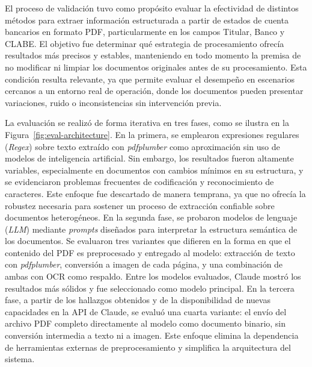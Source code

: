 El proceso de validación tuvo como propósito evaluar la efectividad de distintos métodos para extraer información estructurada a partir de estados de cuenta bancarios en formato PDF, particularmente en los
campos Titular, Banco y CLABE. El objetivo fue determinar qué estrategia de procesamiento ofrecía resultados más precisos y estables, manteniendo en todo momento la premisa de no modificar ni limpiar los
documentos originales antes de su procesamiento. Esta condición resulta relevante, ya que permite evaluar el desempeño en escenarios cercanos a un entorno real de operación, donde los documentos pueden presentar variaciones, ruido o inconsistencias sin intervención previa.

La evaluación se realizó de forma iterativa en tres fases, como se ilustra en la Figura~\ref{fig:eval-architecture}. En la primera, se emplearon expresiones regulares (\textit{Regex}) sobre texto extraído con \textit{pdfplumber} como aproximación sin uso de modelos de inteligencia artificial. Sin embargo, los resultados fueron altamente variables, especialmente en documentos con cambios mínimos en su estructura, y se evidenciaron problemas frecuentes de codificación y reconocimiento de caracteres. Este enfoque fue descartado de manera temprana, ya que no ofrecía la robustez necesaria para sostener un proceso de extracción confiable sobre documentos heterogéneos. En la segunda fase, se probaron modelos de lenguaje (\textit{LLM}) mediante \textit{prompts} diseñados para interpretar la estructura semántica de los documentos. Se evaluaron tres variantes que difieren en la forma en que el contenido del PDF es preprocesado y entregado al modelo: extracción de texto con \textit{pdfplumber}, conversión a imagen de cada página, y una combinación de ambas con OCR como respaldo. Entre los modelos evaluados, Claude mostró los resultados más sólidos y fue seleccionado como modelo principal. En la tercera fase, a partir de los hallazgos obtenidos y de la disponibilidad de nuevas capacidades en la API de Claude, se evaluó una cuarta variante: el envío del archivo PDF completo directamente al modelo como documento binario, sin conversión intermedia a texto ni a imagen. Este enfoque elimina la dependencia de herramientas externas de preprocesamiento y simplifica la arquitectura del sistema.



